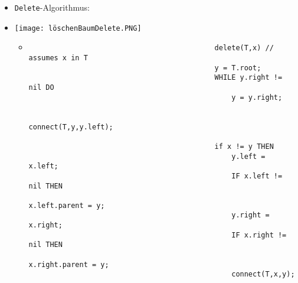 \begin{itemize}
\begin{itemize}
\begin{itemize}
                            \item \texttt{Delete}-Algorithmus:
                            \item[]
                                \begin{minipage}{0.4\textwidth}
                                    \texttt{[image: löschenBaumDelete.PNG]}
                                \end{minipage}
                                \begin{minipage}{0.5\textwidth}
                                    \begin{itemize}
                                        \item[]
                                            \begin{verbatim}
                                            delete(T,x) // assumes x in T
                                            y = T.root;
                                            WHILE y.right != nil DO 
                                                y = y.right;
                                            
                                            connect(T,y,y.left);

                                            if x != y THEN
                                                y.left = x.left;
                                                IF x.left != nil THEN
                                                    x.left.parent = y;
                                                y.right = x.right;
                                                IF x.right != nil THEN
                                                    x.right.parent = y;
                                                connect(T,x,y);
                                            \end{verbatim}
                                    \end{itemize}
                                \end{minipage}
                        \end{itemize}
                \end{itemize}
    \end{itemize}

